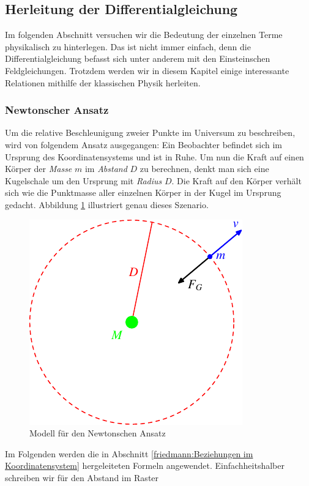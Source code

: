 \begin{refsection}
\subsection{Herleitung der Differentialgleichung \label{friedmann:subsec:Herleitung der Gleichung}}
Im folgenden Abschnitt versuchen wir die Bedeutung der einzelnen Terme physikalisch zu hinterlegen. Das ist nicht immer einfach, denn die Differentialgleichung befasst sich unter anderem mit den Einsteinschen Feldgleichungen. Trotzdem werden wir in diesem Kapitel einige interessante Relationen mithilfe der klassischen Physik herleiten.
\subsubsection{Newtonscher Ansatz}
Um die relative Beschleunigung zweier Punkte im Universum zu beschreiben, wird von folgendem Ansatz ausgegangen: Ein Beobachter befindet sich im Ursprung des Koordinatensystems und ist in Ruhe. Um nun die Kraft auf einen Körper der {\em Masse} $m$ im {\em Abstand} $D$ zu berechnen, denkt man sich eine Kugelschale um den Ursprung mit {\em Radius} $D$. Die Kraft auf den Körper verhält sich wie die Punktmasse aller  einzelnen Körper in der Kugel im Ursprung gedacht. Abbildung \ref{friedmann:gravitation} illustriert genau dieses Szenario.
\begin{figure}[h]
	\centering
	\includegraphics{friedmann/images/friedmann-5.pdf}
	\caption{Modell für den Newtonschen Ansatz
	\label{friedmann:gravitation}}
\end{figure}%
Im Folgenden werden die in  Abschnitt \ref{friedmann:Beziehungen im Koordinatensystem} hergeleiteten Formeln angewendet. Einfachheitshalber schreiben wir für den Abstand im Raster

\end{refsection}
